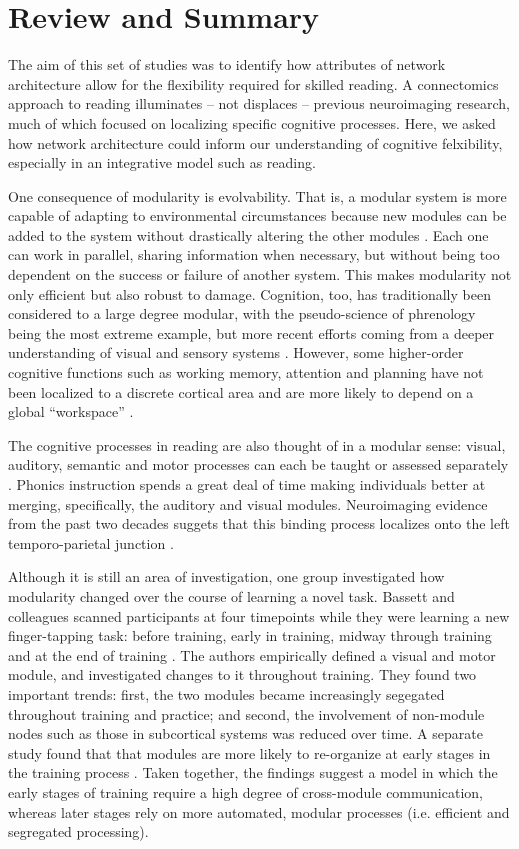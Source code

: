 \chapter{Review and Summary}

The aim of this set of studies was to identify how attributes of network architecture allow for the flexibility required for skilled reading. A connectomics approach to reading illuminates -- not displaces -- previous neuroimaging research, much of which focused on localizing specific cognitive processes. Here, we asked how network architecture could inform our understanding of cognitive felxibility, especially in an integrative model such as reading. 

One consequence of modularity is evolvability. That is, a modular system is more capable of adapting to environmental circumstances because new modules can be added to the system without drastically altering the other modules \citep{Kashton2005}. Each one can work in parallel, sharing information when necessary, but without being too dependent on the success or failure of another system. This makes modularity not only efficient but also robust to damage. Cognition, too, has traditionally been considered to a large degree modular, with the pseudo-science of phrenology being the most extreme example, but more recent efforts coming from a deeper understanding of visual and sensory systems \citep{Barrett2006}. However, some higher-order cognitive functions such as working memory, attention and planning have not been localized to a discrete cortical area and are more likely to depend on a global ``workspace'' \citep{Dahaene1998}.

The cognitive processes in reading are also thought of in a modular sense: visual, auditory, semantic and motor processes can each be taught or assessed separately \citep{Cutting2009a}. Phonics instruction spends a great deal of time making individuals better at merging, specifically, the auditory and visual modules. Neuroimaging evidence from the past two decades suggets that this binding process localizes onto the left temporo-parietal junction \citep{}. 

Although it is still an area of investigation, one group investigated how modularity changed over the course of learning a novel task. Bassett and colleagues scanned participants at four timepoints while they were learning a new finger-tapping task: before training, early in training, midway through training and at the end of training \citep{Bassett2015}. The authors empirically defined a visual and motor module, and investigated changes to it throughout training. They found two important trends: first, the two modules became increasingly segegated throughout training and practice; and second, the involvement of non-module nodes such as those in subcortical systems was reduced over time. A separate study found that that modules are more likely to re-organize at early stages in the training process \citep{Bassett2011}. Taken together, the findings suggest a model in which the early stages of training require a high degree of cross-module communication, whereas later stages rely on more automated, modular processes (i.e. efficient and segregated processing). 



